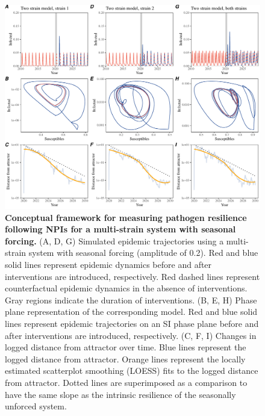 \documentclass[12pt]{article}
\begin{document}
\begin{figure}[!th]
\includegraphics[width=\textwidth]{../figure2/figure2_multi.pdf}
\caption{
\textbf{Conceptual framework for measuring pathogen resilience following NPIs for a multi-strain system with seasonal forcing.}
(A, D, G) Simulated epidemic trajectories using a multi-strain system with seasonal forcing (amplitude of 0.2).
Red and blue solid lines represent epidemic dynamics before and after interventions are introduced, respectively.
Red dashed lines represent counterfactual epidemic dynamics in the absence of interventions.
Gray regions indicate the duration of interventions.
(B, E, H) Phase plane representation of the corresponding model.
Red and blue solid lines represent epidemic trajectories on an SI phase plane before and after interventions are introduced, respectively.
(C, F, I) Changes in logged distance from attractor over time.
Blue lines represent the logged distance from attractor.
Orange lines represent the locally estimated scatterplot smoothing (LOESS) fits to the logged distance from attractor.
Dotted lines are superimposed as a comparison to have the same slope as the intrinsic resilience of the seasonally unforced system.
}
\end{figure}

\pagebreak
\end{document}
